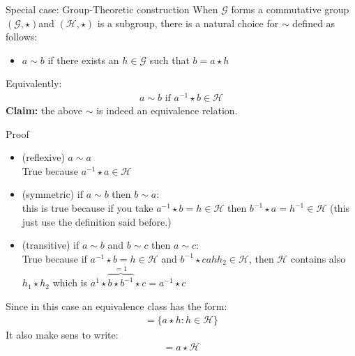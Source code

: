 \begin{parag}{Special case: Group-Theoretic construction}
    When $\mathcal{G}$ forms a commutative group $\left(\mathcal{G}, \star \right)$and $\left(\mathcal{H}, \star \right)$ is a subgroup, there is a natural choice for $\sim$ defined as follows:
    \begin{itemize}
	    \item $a \sim b$ if there exists an $h \in \mathcal{G}$ such that $b = a \star  h$
    \end{itemize}
    Equivalently:
    \begin{align*} a \sim b \text{ if } a^{-1} \star  b \in \mathcal{H}\end{align*}
    \textbf{Claim:} the above $\sim$ is indeed an equivalence relation.
    \begin{subparag}{Proof}
        \begin{itemize}
		\item (reflexive) $a \sim a$ \\
			True because $a^{-1} \star  a \in \mathcal{H}$
		\item (symmetric) if $a \sim b$ then $b \sim a$: \\
			this is true because if you take $a^{-1} \star  b = h \in \mathcal{H}$ then $b^{-1} \star  a = h^{-1} \in \mathcal{H}$ (this just use the definition said before.)
		\item (transitive) if $a \sim b$ and $b \sim c$ then $a \sim c$: \\
			True because if $a^{-1} \star  b =  h \in \mathcal{H}$ and $b^{-1} \star  c ah h_2 \in \mathcal{H}$, then $\mathcal{H}$ contains also $h_1 \star  h_2$ which is $a^{1} \star  \overbrace{b \star  b^{-1}}^{= 1} \star  c =  a^{-1} \star  c$
        \end{itemize}
	Since in this case an equivalence class has the form:
	\begin{align*} [a] =  \{a \star  h : h \in \mathcal{H}\} \end{align*}
	It also make sens to write:
	\begin{align*} [a] =  a \star  \mathcal{H} \end{align*}
    \end{subparag}
    

\end{parag}
